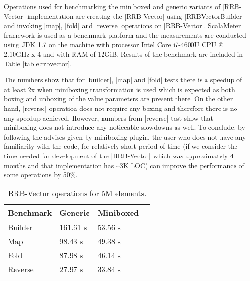 Operations used for benchmarking the miniboxed and generic variants of |RRB-Vector| implementation are creating the |RRB-Vector| using |RRBVectorBuilder| and invoking |map|, |fold| and |reverse| operations on |RRB-Vector|. ScalaMeter framework \cite{scalameter} is used as a benchmark platform and the measurements are conducted using JDK 1.7 on the machine with processor Intel Core i7-4600U CPU @ 2.10GHz x 4 and with RAM of 12GiB. Results of the benchmark are included in Table \ref{table:rrbvector}.

The numbers show that for |builder|, |map| and |fold| tests there is a speedup of at least 2x when miniboxing transformation is used which is expected as both boxing and unboxing of the value parameters are present there. On the other hand, |reverse| operation does not require any boxing and therefore there is no any speedup achieved. However, numbers from |reverse| test show that miniboxing does not introduce any noticeable slowdowns as well. To conclude, by following the advises given by miniboxing plugin, the user who does not have any familiarity with the code, for relatively short period of time (if we consider the time needed for development of the |RRB-Vector| which was approximately 4 months and that implementation has \textasciitilde3K LOC) can improve the performance of some operations by 50\%.





\begin{table}[t]
  \centering
  \begin{tabularx}{0.48\textwidth}{|g *{3}{|Y}|} \hline
    \textbf{Benchmark} & \textbf{Generic}      & \textbf{Miniboxed} \\  \hline
    Builder            &        161.61 s       &           53.56 s  \\
    Map                &         98.43 s       &           49.38 s  \\
    Fold               &         87.98 s       &           46.14 s  \\
    Reverse            &         27.97 s       &           33.84 s  \\  \hline
  \end{tabularx}
  \vspace{-2mm}
  \caption{RRB-Vector operations for 5M elements.}
  \label{table:pureimage}
  \vspace{-1em}
\end{table}


